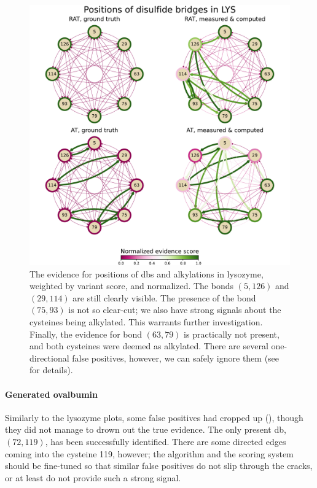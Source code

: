 \begin{figure}
  \centering
  \includegraphics[width=0.9\linewidth]{img/pdfa-lys.pdf}
  \caption{The evidence for positions of \glspl*{db} and alkylations in lysozyme, weighted by variant score, and normalized. The bonds \((5, 126)\) and \((29, 114)\) are still clearly visible. The presence of the bond \((75, 93)\) is not so clear-cut; we also have strong signals about the cysteines being alkylated. This warrants further investigation. Finally, the evidence for bond \((63, 79)\) is practically not present, and both cysteines were deemed as alkylated. There are several one-directional false positives, however, we can safely ignore them (see  for details).}\label{fig:lys}
\end{figure}

\paragraph{Generated ovalbumin} Similarly to the lysozyme plots, some false positives had cropped up (), though they did not manage to drown out the true evidence. The only present \gls*{db}, \((72, 119)\), has been successfully identified. There are some directed edges coming into the cysteine 119, however; the algorithm and the scoring system should be fine-tuned so that similar false positives do not slip through the cracks, or at least do not provide such a strong signal.


